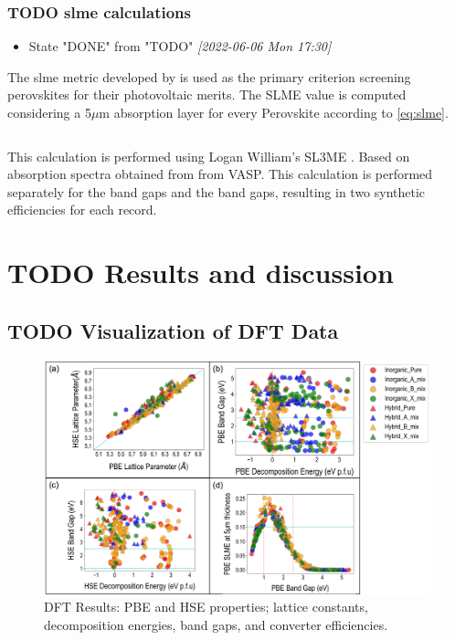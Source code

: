 \documentclass[twoside, twocolumn, 9pt, draft]{article}
\begin{document}
\subsubsection*{{\bfseries\sffamily TODO} \gls{slme} calculations}
\label{sec:org30a0e6a}
\begin{itemize}
\item State "DONE"       from "TODO"       \textit{[2022-06-06 Mon 17:30]}
\end{itemize}
The \gls{slme} metric developed by \citet{yu-2012-ident-poten} is used
as the primary criterion screening perovskites for their photovoltaic
merits. The SLME value is computed considering a 5\(\mu\)m absorption
layer for every Perovskite according to \eqref{eq:slme}.

\begin{equation}\label{eq:slme}

\end{equation}

This calculation is performed using Logan William's SL3ME
\cite{williams-2022-sl3me}. Based on absorption spectra obtained from
from VASP. This calculation is performed separately for the 
band gaps and the  band gaps, resulting in two synthetic
efficiencies for each record.

\section*{{\bfseries\sffamily TODO} Results and discussion}
\label{sec:org170aaa6}
\subsection*{{\bfseries\sffamily TODO} Visualization of DFT Data}
\label{sec:org21b5c18}
\begin{figure}
\centering
\includegraphics[width=.9\linewidth]{Figure2.png}
\caption{\label{fig:pairplots} DFT Results: PBE and HSE properties; lattice constants, decomposition energies, band gaps, and converter efficiencies.}
\end{figure}
\end{document}
